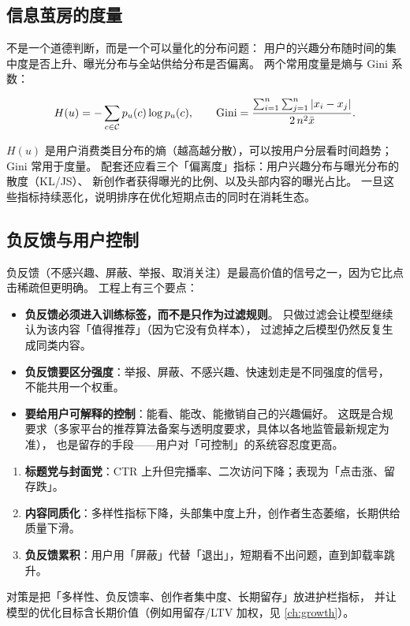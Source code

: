 \subsection{信息茧房的度量}

 不是一个道德判断，而是一个可以量化的分布问题：
用户的兴趣分布随时间的集中度是否上升、曝光分布与全站供给分布是否偏离。
两个常用度量是熵与 Gini 系数：

\begin{equation}
H(u) = -\sum_{c \in \mathcal{C}} p_u(c) \log p_u(c),
\qquad
\text{Gini} = \frac{\sum_{i=1}^{n} \sum_{j=1}^{n} \left\lvert x_i - x_j \right\rvert}{2\, n^{2} \bar{x}} .
\label{eq:diversity}
\end{equation}

$H(u)$ 是用户消费类目分布的熵（越高越分散），可以按用户分层看时间趋势；
$\text{Gini}$ 常用于度量。
配套还应看三个「偏离度」指标：用户兴趣分布与曝光分布的散度（KL/JS）、
新创作者获得曝光的比例、以及头部内容的曝光占比。
一旦这些指标持续恶化，说明排序在优化短期点击的同时在消耗生态。

\subsection{负反馈与用户控制}

负反馈（不感兴趣、屏蔽、举报、取消关注）是最高价值的信号之一，因为它比点击稀疏但更明确。
工程上有三个要点：

\begin{itemize}
  \item \textbf{负反馈必须进入训练标签，而不是只作为过滤规则}。
        只做过滤会让模型继续认为该内容「值得推荐」（因为它没有负样本），
        过滤掉之后模型仍然反复生成同类内容。
  \item \textbf{负反馈要区分强度}：举报、屏蔽、不感兴趣、快速划走是不同强度的信号，
        不能共用一个权重。
  \item \textbf{要给用户可解释的控制}：能看、能改、能撤销自己的兴趣偏好。
        这既是合规要求（多家平台的推荐算法备案与透明度要求，具体以各地监管最新规定为准），
        也是留存的手段——用户对「可控制」的系统容忍度更高。
\end{itemize}

\begin{pitfall}[把短期指标当北极星的三种后果]
\begin{enumerate}
  \item \textbf{标题党与封面党}：CTR 上升但完播率、二次访问下降；表现为「点击涨、留存跌」。
  \item \textbf{内容同质化}：多样性指标下降，头部集中度上升，创作者生态萎缩，长期供给质量下滑。
  \item \textbf{负反馈累积}：用户用「屏蔽」代替「退出」，短期看不出问题，直到卸载率跳升。
\end{enumerate}
对策是把「多样性、负反馈率、创作者集中度、长期留存」放进护栏指标，
并让模型的优化目标含长期价值（例如用留存/LTV 加权，见 \cref{ch:growth}）。
\end{pitfall}

